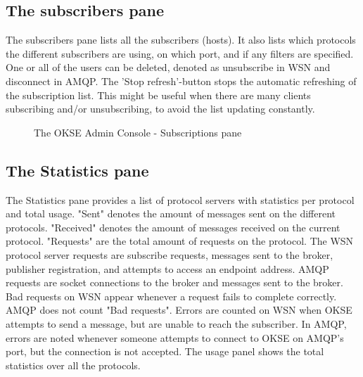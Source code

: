 \subsection{The subscribers pane}
The subscribers pane lists all the subscribers (hosts). It also lists which protocols the different subscribers are using, on which port, and if any filters are specified. One or all of the users can be deleted, denoted as unsubscribe in WSN and disconnect in AMQP. The 'Stop refresh'-button stops the automatic refreshing of the subscription list. This might be useful when there are many clients subscribing and/or unsubscribing, to avoid the list updating constantly.

\begin{center}
  \begin{figure}[ht!]
    \caption{The OKSE Admin Console - Subscriptions pane} 
    \label{fig:OKSE Admin Console - Subscriptions pane}
  \end{figure}
\end{center}

\subsection{The Statistics pane}
The Statistics pane provides a list of protocol servers with statistics per protocol and total usage. "Sent" denotes the amount of messages sent on the different protocols. "Received" denotes the amount of messages received on the current protocol. "Requests" are the total amount of requests on the protocol. The WSN protocol server requests are subscribe requests, messages sent to the broker, publisher registration, and attempts to access an endpoint address. AMQP requests are socket connections to the broker and messages sent to the broker. Bad requests on WSN appear whenever a request fails to complete correctly. AMQP does not count "Bad requests". Errors are counted on WSN when OKSE attempts to send a message, but are unable to reach the subscriber. In AMQP, errors are noted whenever someone attempts to connect to OKSE on AMQP's port, but the connection is not accepted. The usage panel shows the total statistics over all the protocols.

